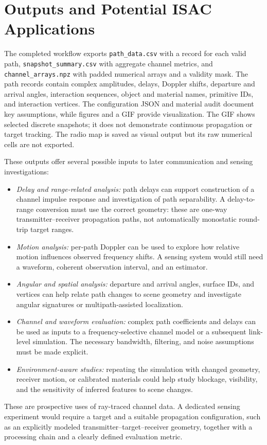 \documentclass[conference]{IEEEtran}
\begin{document}
\section{Outputs and Potential ISAC Applications}
The completed workflow exports \texttt{path\_data.csv} with a record for each valid path, \texttt{snapshot\_summary.csv} with aggregate channel metrics, and \texttt{channel\_arrays.npz} with padded numerical arrays and a validity mask. The path records contain complex amplitudes, delays, Doppler shifts, departure and arrival angles, interaction sequences, object and material names, primitive IDs, and interaction vertices. The configuration JSON and material audit document key assumptions, while figures and a GIF provide visualization. The GIF shows selected discrete snapshots; it does not demonstrate continuous propagation or target tracking. The radio map is saved as visual output but its raw numerical cells are not exported.

These outputs offer several possible inputs to later communication and sensing investigations:
\begin{itemize}
\item \emph{Delay and range-related analysis:} path delays can support construction of a channel impulse response and investigation of path separability. A delay-to-range conversion must use the correct geometry: these are one-way transmitter--receiver propagation paths, not automatically monostatic round-trip target ranges.
\item \emph{Motion analysis:} per-path Doppler can be used to explore how relative motion influences observed frequency shifts. A sensing system would still need a waveform, coherent observation interval, and an estimator.
\item \emph{Angular and spatial analysis:} departure and arrival angles, surface IDs, and vertices can help relate path changes to scene geometry and investigate angular signatures or multipath-assisted localization.
\item \emph{Channel and waveform evaluation:} complex path coefficients and delays can be used as inputs to a frequency-selective channel model or a subsequent link-level simulation. The necessary bandwidth, filtering, and noise assumptions must be made explicit.
\item \emph{Environment-aware studies:} repeating the simulation with changed geometry, receiver motion, or calibrated materials could help study blockage, visibility, and the sensitivity of inferred features to scene changes.
\end{itemize}
These are prospective uses of ray-traced channel data. A dedicated sensing experiment would require a target and a suitable propagation configuration, such as an explicitly modeled transmitter--target--receiver geometry, together with a processing chain and a clearly defined evaluation metric.
\end{document}
